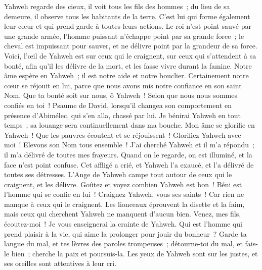 \begin{multicols}{2}
Yahweh regarde des cieux, il voit tous les fils des hommes~;
du lieu de sa demeure, il observe tous les habitants de la terre.
C'est lui qui forme également leur cœur et qui prend garde à toutes leurs actions.
Le roi n'est point sauvé par une grande armée, l'homme puissant n'échappe point par sa grande force~;
le cheval est impuissant pour sauver, et ne délivre point par la grandeur de sa force.
Voici, l'œil de Yahweh est sur ceux qui le craignent, sur ceux qui s'attendent à sa bonté,
afin qu'il les délivre de la mort, et les fasse vivre durant la famine.
Notre âme espère en Yahweh~; il est notre aide et notre bouclier.
Certainement notre cœur se réjouit en lui, parce que nous avons mis notre confiance en son saint Nom.
Que ta bonté soit sur nous, ô Yahweh~! Selon que nous nous sommes confiés en toi~!
\VerseOne{}Psaume de David, lorsqu'il changea son comportement en présence d'Abimélec, qui s'en alla, chassé par lui.
 Je bénirai Yahweh en tout temps~; sa louange sera continuellement dans ma bouche.
 Mon âme se glorifie en Yahweh~! Que les pauvres écoutent et se réjouissent~!
 Glorifiez Yahweh avec moi~! Elevons son Nom tous ensemble~!
 J'ai cherché Yahweh et il m'a répondu~; il m'a délivré de toutes mes frayeurs.
 Quand on le regarde, on est illuminé, et la face n'est point confuse.
 Cet affligé a crié, et Yahweh l'a exaucé, et l'a délivré de toutes ses détresses.
 L'Ange de Yahweh campe tout autour de ceux qui le craignent, et les délivre.
 Goûtez et voyez combien Yahweh est bon~! Béni est l'homme qui se confie en lui~!
 Craignez Yahweh, vous ses saints~! Car rien ne manque à ceux qui le craignent.
 Les lionceaux éprouvent la disette et la faim, mais ceux qui cherchent Yahweh ne manquent d'aucun bien.
 Venez, mes fils, écoutez-moi~! Je vous enseignerai la crainte de Yahweh.
 Qui est l'homme qui prend plaisir à la vie, qui aime la prolonger pour jouir du bonheur~?
 Garde ta langue du mal, et tes lèvres des paroles trompeuses~;
 détourne-toi du mal, et fais-le bien~; cherche la paix et poursuis-la.
 Les yeux de Yahweh sont sur les justes, et ses oreilles sont attentives à leur cri.

\end{multicols}
